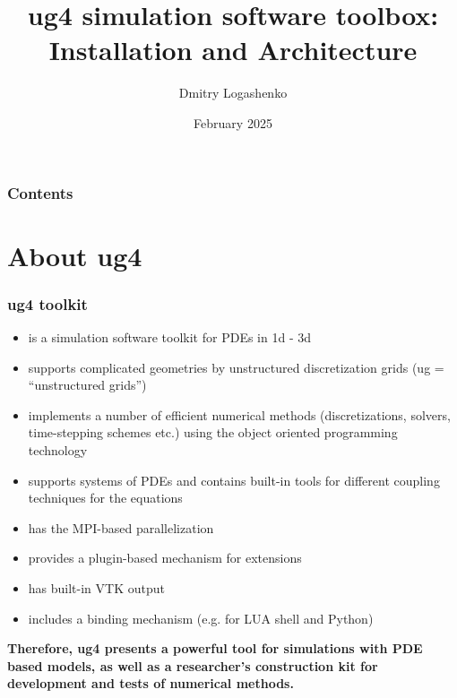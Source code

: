 \documentclass[xcolor=dvipsnames]{beamer}
\title
 [ug4: Installation + Architecture]
 {ug4 simulation software toolbox: \\ Installation and Architecture}
\author [D. Logashenko] {Dmitry Logashenko}
\institute [CEMSE]
{CEMSE, KAUST, Saudi Arabia}
\date [Feb. 2025] {February 2025}
\begin{document}
\frame {\titlepage}

\begin {frame} [t]
\frametitle {Contents}
\tableofcontents
\end {frame}

\section {About ug4}

\begin {frame} [t]
\frametitle {ug4 toolkit}
\vspace {-2ex}
\begin {itemize}
	\item is a simulation software toolkit for {\color{blue} PDEs in 1d - 3d}
	\pause
	\item supports complicated geometries by {\color{blue} unstructured discretization grids}
		(ug = ``unstructured grids'')
	\pause
	\item implements a number of {\color{blue} efficient numerical methods} (discretizations, solvers,
		time-stepping schemes etc.) using the object oriented programming technology
	\pause
	\item supports {\color{blue} systems of PDEs} and contains built-in tools for different
		{\color{blue} coupling} techniques for the equations
	\pause
	\item has the MPI-based {\color{blue} parallelization}
	\pause
	\item provides a {\color{blue} plugin-based mechanism for extensions}
	\pause
	\item has built-in {\color{blue} VTK output}
	\pause
	\item includes a binding mechanism (e.g. for LUA {\color{blue} shell} and Python)
\end {itemize}
\pause
\begin {center}
\textbf {Therefore, ug4 presents a powerful tool for simulations with PDE based models, as well as
a researcher's construction kit for development and tests of numerical methods.}
\end {center}
\end {frame}
\end{document}
